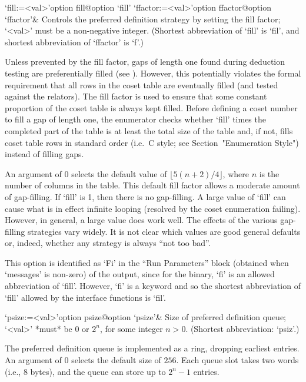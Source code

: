 \beginitems

\>`fill:=<val>'{option fill}@{option `fill'}
\>`ffactor:=<val>'{option ffactor}@{option `ffactor'}&
Controls the preferred definition strategy by setting the fill factor;
`<val>' must be a non-negative integer.
(Shortest abbreviation of `fill' is `fil', and  shortest  abbreviation
of `ffactor' is `f'.)

Unless prevented by the fill factor, gaps of length one  found  during
deduction  testing  are  preferentially   filled   (see \cite{Hav91}).
However, this potentially violates the  formal  requirement  that  all
rows in the coset table are eventually filled (and tested against  the
relators). The fill factor  is  used  to  ensure  that  some  constant
proportion of the coset table is always kept filled. Before defining a
coset number to fill a  gap  of  length  one,  the  enumerator  checks
whether `fill' times the completed part of the table is at  least  the
total size of the table  and,  if  not,  fills  coset  table  rows  in
standard order (i.e.~C style; see Section~"Enumeration Style") instead
of filling gaps.

An  argument of  0  selects  the default  value  of $\lfloor  5(n+2)/4
\rfloor$,  where $n$  is the  number of  columns in  the  table.  This
default  fill factor  allows  a moderate  amount  of gap-filling.   If
`fill' is  1, then there is  no gap-filling.  A large  value of `fill'
can cause  what is in effect  infinite looping (resolved  by the coset
enumeration failing).   However, in general,  a large value  does work
well.  The  effects of the various gap-filling  strategies vary widely.
It is  not clear  which values are  good general defaults  or, indeed,
whether any strategy is always ``not too bad''.

This option is identified as `Fi'  in  the  ``Run  Parameters''  block
(obtained when `messages' is non-zero) of the {\ACE} output, since for
the {\ACE} binary, `fi' is an allowed abbreviation of `fill'. However,
`fi' is a {\GAP} keyword and so the shortest  abbreviation  of  `fill'
allowed by the interface functions is `fil'.

\>`psize:=<val>'{option psize}@{option `psize'}&
Size of preferred definition queue; `<val>' *must* be 0 or $2^n$,  for
some integer $n>0$. (Shortest abbreviation: `psiz'.)

The  preferred definition  queue is  implemented as  a  ring, dropping
earliest entries. An argument of 0 selects  the default size of $256$.
Each  queue slot takes two words (i.e., 8 bytes),  and the  queue  can
store up to $2^n-1$ entries.

